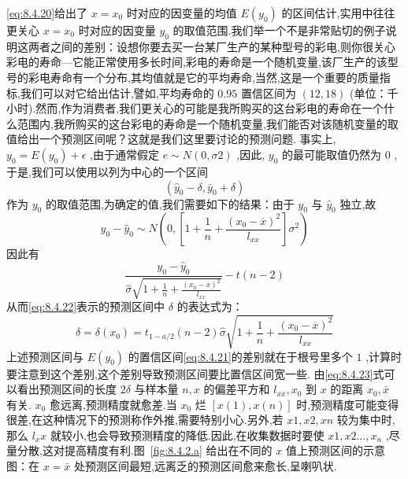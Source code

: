\ref{eq:8.4.20}给出了 $ x=x_0 $ 时对应的因变量的均值 $ E(y_0) $ 的区间估计,实用中往往更关心 $ x=x_0 $ 时对应的因变量 $ y_0 $ 的取值范围.我们举一个不是非常贴切的例子说明这两者之间的差别：设想你要去买一台某厂生产的某种型号的彩电,则你很关心彩电的寿命—它能正常使用多长时间,彩电的寿命是一个随机变量,该厂生产的该型号的彩电寿命有一个分布,其均值就是它的平均寿命,当然,这是一个重要的质量指标,我们可以对它给出估计,譬如,平均寿命的 $ 0.95 $ 置信区间为 $ (12,18) $ (单位：千小时).然而,作为消费者,我们更关心的可能是我所购买的这台彩电的寿命在一个什么范围内,我所购买的这台彩电的寿命是一个随机变量,我们能否对该随机变量的取值给出一个预测区间呢？这就是我们这里要讨论的预测问题.
事实上, $ y_0=E(y_0)+\epsilon $ ,由于通常假定 $ e\sim N(0,\sigma 2) $ ,因此, $ y_0 $ 的最可能取值仍然为 $ 0 $ ,于是,我们可以使用以列为中心的一个区间
\[
\left( \widehat{y}_0-\delta ,\bar{y}_0+\delta \right) 
\]
作为 $ y_0 $ 的取值范围,为确定的值,我们需要如下的结果：由于 $ y_0 $ 与 $ \hat{y}_0 $ 独立,故
\[
y_{0}-\hat{y}_{0} \sim N\left(0,\left[1+\frac{1}{n}+\frac{\left(x_{0}-\overline{x}\right)^{2}}{l_{x x}}\right] \sigma^{2}\right)
\]
因此有
\[
\frac{y_{0}-\hat{y}_{0}}{\hat{\sigma} \sqrt{1+\frac{1}{n}+\frac{\left(x_{0}-\overline{x}\right)^{2}}{l_{x x}}}}-t(n-2)
\]
从而\ref{eq:8.4.22}表示的预测区间中 $ \delta $ 的表达式为：
\begin{equation}
\delta=\delta\left(x_{0}\right)=t_{1-a / 2}(n-2) \hat{\sigma} \sqrt{1+\frac{1}{n}+\frac{\left(x_{0}-\overline{x}\right)^{2}}{l_{x x}}}\label{eq:8.4.23}
\end{equation}
上述预测区间与 $ E(y_0) $ 的置信区间\ref{eq:8.4.21}的差别就在于根号里多个 $ 1 $ ,计算时要注意到这个差别,这个差别导致预测区间要比置信区间宽一些.
由\ref{eq:8.4.23}式可以看出预测区间的长度 $ 2\delta $ 与样本量 $ n,x $ 的偏差平方和 $ l_{xx},x_0 $ 到 $ x $ 的距离 $ x_0,\bar{x} $ 有关. $ x_0 $ 愈远离,预测精度就愈差.当 $ x_0 $ 烂 $ [x(1),x(n)] $ 时,预测精度可能变得很差,在这种情况下的预测称作外推,需要特别小心.另外,若 $ x1,x2,xn $ 较为集中时,那么 $ l_xx $ 就较小,也会导致预测精度的降低.因此,在收集数据时要使 $ x1,x2…,x_n $ ,尽量分散,这对提高精度有利.图~\ref{fig:8.4.2.a}
给出在不同的 $ x $ 值上预测区间的示意图：在 $ x=\bar{x} $ 处预测区间最短,远离乏的预测区间愈来愈长,呈喇叭状.

